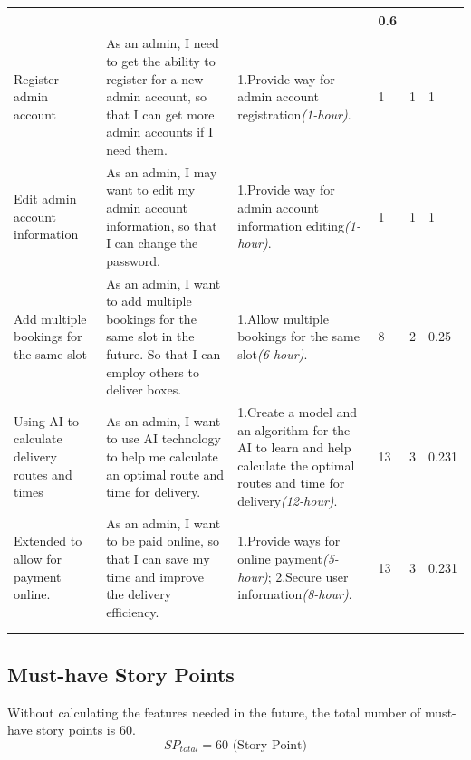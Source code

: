 \documentclass{report}
\begin{document}
\begin{tabularx}{0.95\linewidth}{%
  >{\raggedright\arraybackslash}p{1.5cm}%
  >{\raggedright\arraybackslash}X%
  >{\raggedright\arraybackslash}X%
  p{1cm}p{1cm}p{1cm}
  }
  & 5
  & 3
  & 0.6
  \\
  \midrule
  Register admin account
  & As an admin, I need to get the ability to register for a new admin account, so that I can get more admin accounts if I need them.
  & 1.Provide way for admin account registration\textit{(1-hour)}.
  & 1
  & 1
  & 1
  \\
  \midrule
  Edit admin account information
  & As an admin, I may want to edit my admin account information, so that I can change the password.
  & 1.Provide way for admin account information editing\textit{(1-hour)}.
  & 1
  & 1
  & 1
  \\
  \midrule
  Add multiple bookings for the same slot
  & As an admin, I want to add multiple bookings for the same slot in the future. So that I  can employ others to deliver boxes.
  & 1.Allow multiple bookings for the same slot\textit{(6-hour)}.
  & 8
  & 2
  & 0.25
  \\
  \midrule
  Using AI to calculate delivery routes and times
  & As an admin, I want to use AI technology to help me calculate an optimal route and time for delivery.
  & 1.Create a model and an algorithm for the AI to learn and help calculate the optimal routes and time for delivery\textit{(12-hour)}.
  & 13
  & 3
  & 0.231
  \\
  \midrule
  Extended to allow for payment online.
  & As an admin, I want to be paid online, so that I can save my time and improve the delivery efficiency.
  & 1.Provide ways for online payment\textit{(5-hour)}; 2.Secure user information\textit{(8-hour)}.
  & 13
  & 3
  & 0.231
  \\
  \bottomrule
  \\
  \caption{Product Backlog}  
  \label{tab:productBacklog}
\end{tabularx}  

\subsection{Must-have Story Points}
Without calculating the features needed in the future, the total number of must-have story points is 60.
$$
SP_{total} = 60 \text{ (Story Point)}
$$
\end{document}
